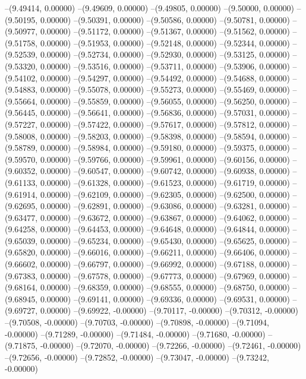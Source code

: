 --(9.49414, 0.00000)
--(9.49609, 0.00000)
--(9.49805, 0.00000)
--(9.50000, 0.00000)
--(9.50195, 0.00000)
--(9.50391, 0.00000)
--(9.50586, 0.00000)
--(9.50781, 0.00000)
--(9.50977, 0.00000)
--(9.51172, 0.00000)
--(9.51367, 0.00000)
--(9.51562, 0.00000)
--(9.51758, 0.00000)
--(9.51953, 0.00000)
--(9.52148, 0.00000)
--(9.52344, 0.00000)
--(9.52539, 0.00000)
--(9.52734, 0.00000)
--(9.52930, 0.00000)
--(9.53125, 0.00000)
--(9.53320, 0.00000)
--(9.53516, 0.00000)
--(9.53711, 0.00000)
--(9.53906, 0.00000)
--(9.54102, 0.00000)
--(9.54297, 0.00000)
--(9.54492, 0.00000)
--(9.54688, 0.00000)
--(9.54883, 0.00000)
--(9.55078, 0.00000)
--(9.55273, 0.00000)
--(9.55469, 0.00000)
--(9.55664, 0.00000)
--(9.55859, 0.00000)
--(9.56055, 0.00000)
--(9.56250, 0.00000)
--(9.56445, 0.00000)
--(9.56641, 0.00000)
--(9.56836, 0.00000)
--(9.57031, 0.00000)
--(9.57227, 0.00000)
--(9.57422, 0.00000)
--(9.57617, 0.00000)
--(9.57812, 0.00000)
--(9.58008, 0.00000)
--(9.58203, 0.00000)
--(9.58398, 0.00000)
--(9.58594, 0.00000)
--(9.58789, 0.00000)
--(9.58984, 0.00000)
--(9.59180, 0.00000)
--(9.59375, 0.00000)
--(9.59570, 0.00000)
--(9.59766, 0.00000)
--(9.59961, 0.00000)
--(9.60156, 0.00000)
--(9.60352, 0.00000)
--(9.60547, 0.00000)
--(9.60742, 0.00000)
--(9.60938, 0.00000)
--(9.61133, 0.00000)
--(9.61328, 0.00000)
--(9.61523, 0.00000)
--(9.61719, 0.00000)
--(9.61914, 0.00000)
--(9.62109, 0.00000)
--(9.62305, 0.00000)
--(9.62500, 0.00000)
--(9.62695, 0.00000)
--(9.62891, 0.00000)
--(9.63086, 0.00000)
--(9.63281, 0.00000)
--(9.63477, 0.00000)
--(9.63672, 0.00000)
--(9.63867, 0.00000)
--(9.64062, 0.00000)
--(9.64258, 0.00000)
--(9.64453, 0.00000)
--(9.64648, 0.00000)
--(9.64844, 0.00000)
--(9.65039, 0.00000)
--(9.65234, 0.00000)
--(9.65430, 0.00000)
--(9.65625, 0.00000)
--(9.65820, 0.00000)
--(9.66016, 0.00000)
--(9.66211, 0.00000)
--(9.66406, 0.00000)
--(9.66602, 0.00000)
--(9.66797, 0.00000)
--(9.66992, 0.00000)
--(9.67188, 0.00000)
--(9.67383, 0.00000)
--(9.67578, 0.00000)
--(9.67773, 0.00000)
--(9.67969, 0.00000)
--(9.68164, 0.00000)
--(9.68359, 0.00000)
--(9.68555, 0.00000)
--(9.68750, 0.00000)
--(9.68945, 0.00000)
--(9.69141, 0.00000)
--(9.69336, 0.00000)
--(9.69531, 0.00000)
--(9.69727, 0.00000)
--(9.69922, -0.00000)
--(9.70117, -0.00000)
--(9.70312, -0.00000)
--(9.70508, -0.00000)
--(9.70703, -0.00000)
--(9.70898, -0.00000)
--(9.71094, -0.00000)
--(9.71289, -0.00000)
--(9.71484, -0.00000)
--(9.71680, -0.00000)
--(9.71875, -0.00000)
--(9.72070, -0.00000)
--(9.72266, -0.00000)
--(9.72461, -0.00000)
--(9.72656, -0.00000)
--(9.72852, -0.00000)
--(9.73047, -0.00000)
--(9.73242, -0.00000)
